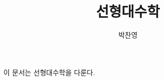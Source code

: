 \documentclass[a4paper]{book}
\author{박찬영}
\title{선형대수학}
\begin{document}
\maketitle
이 문서는 선형대수학을 다룬다.
\end{document}
